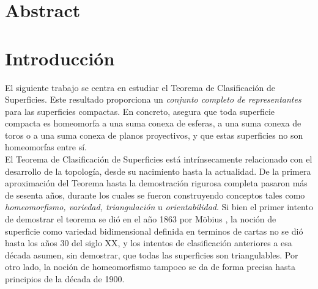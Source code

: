 \documentclass[10pt]{report}
\theoremstyle{definition}
\begin{document}
\section*{Abstract}
\clearpage

\section*{Introducción}
El siguiente trabajo se centra en estudiar el Teorema de Clasificación de Superficies. Este resultado proporciona un \textit{conjunto completo de representantes} para las superficies compactas. En concreto, asegura que toda superficie compacta es homeomorfa a una suma conexa de esferas, a una suma conexa de toros o a una suma conexa de planos proyectivos, y que estas superficies no son homeomorfas entre sí.\\

El Teorema de Clasificación de Superficies está intrínsecamente relacionado con el desarrollo de la topología, desde su nacimiento hasta la actualidad. De la primera aproximación del Teorema hasta la demostración rigurosa completa pasaron más de sesenta años, durante los cuales se fueron construyendo conceptos tales como \textit{homeomorfismo, variedad, triangulación} u \textit{orientabilidad}. Si bien el primer intento de demostrar el teorema se dió en el año 1863 por Möbius \cite{mobius}, la noción de superficie como variedad bidimensional definida en terminos de cartas no se dió hasta los años 30 del siglo XX, y los intentos de clasificación anteriores a esa década asumen, sin demostrar, que todas las superficies son triangulables. Por otro lado, la noción de homeomorfismo tampoco se da de forma precisa hasta principios de la década de 1900.\\
\end{document}
